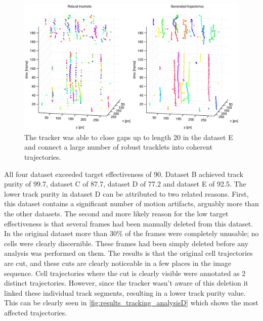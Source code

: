 		\begin{figure}[h]
			\centering
			\includegraphics[width=\textwidth]{images/fig_results_tracking_analysis5}
			\caption{The tracker was able to close gaps up to length 20 in the dataset E and connect a large number of robust tracklets into coherent trajectories.}
			\label{fig:results_tracking_analysisE}
		\end{figure}

		All four dataset exceeded target effectiveness of 90. Dataset B achieved track purity of 99.7, dataset C of 87.7, dataset D of 77.2 and dataset E of 92.5. The lower track purity in dataset D can be attributed to two related reasons. First, this dataset contains a significant number of motion artifacts, arguably more than the other datasets. The second and more likely reason for the low target effectiveness is that several frames had been manually deleted from this dataset. In the original dataset more than 30\% of the frames were completely unusable; no cells were clearly discernible. These frames had been simply deleted before any analysis was performed on them. The results is that the original cell trajectories are cut, and these cuts are clearly noticeable in a few places in the image sequence. Cell trajectories where the cut is clearly visible were annotated as 2 distinct trajectories. However, since the tracker wasn't aware of this deletion it linked these individual track segments, resulting in a lower track purity value. This can be clearly seen in \cref{fig:results_tracking_analysisD} which shows the most affected trajectories.
		
